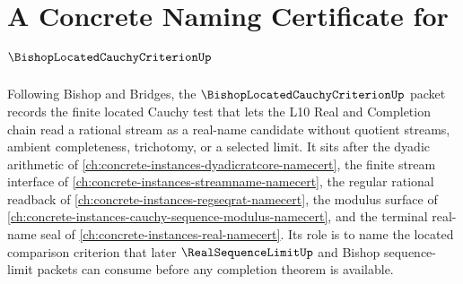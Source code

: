 \chapter{A Concrete Naming Certificate for $\BishopLocatedCauchyCriterionUp$}
\label{ch:concrete-instances-bishop-located-cauchy-criterion-namecert}

Following Bishop and Bridges, the $\BishopLocatedCauchyCriterionUp$ packet records the finite located Cauchy test that lets the L10 Real and Completion chain read a rational stream as a real-name candidate without quotient streams, ambient completeness, trichotomy, or a selected limit. It sits after the dyadic arithmetic of \autoref{ch:concrete-instances-dyadicratcore-namecert}, the finite stream interface of \autoref{ch:concrete-instances-streamname-namecert}, the regular rational readback of \autoref{ch:concrete-instances-regseqrat-namecert}, the modulus surface of \autoref{ch:concrete-instances-cauchy-sequence-modulus-namecert}, and the terminal real-name seal of \autoref{ch:concrete-instances-real-namecert}. Its role is to name the located comparison criterion that later $\RealSequenceLimitUp$ and Bishop sequence-limit packets can consume before any completion theorem is available.

